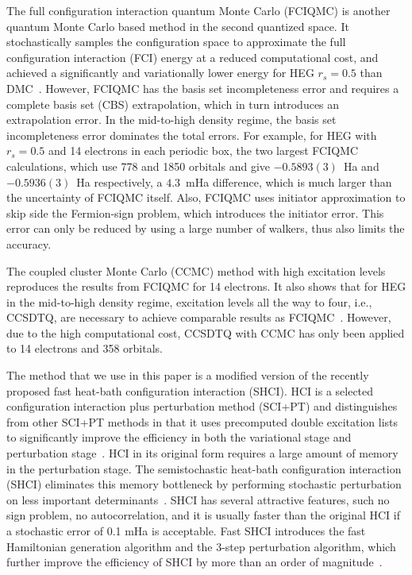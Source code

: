 The full configuration interaction quantum Monte Carlo (FCIQMC) is another quantum Monte Carlo based method in the second quantized space. It stochastically samples the configuration space to approximate the full configuration interaction (FCI) energy at a reduced computational cost, and achieved a significantly and variationally lower energy for HEG $r_s=0.5$ than DMC~\cite{shepherd2012investigation}.
However, FCIQMC has the basis set incompleteness error and requires a complete basis set (CBS) extrapolation, which in turn introduces an extrapolation error.
In the mid-to-high density regime, the basis set incompleteness error dominates the total errors.
For example, for HEG with $r_s=0.5$ and 14 electrons in each periodic box, the two largest FCIQMC calculations, which use 778 and 1850 orbitals and give $-0.5893(3)$~Ha and $-0.5936(3)$~Ha respectively, a $4.3$~mHa difference, which is much larger than the uncertainty of FCIQMC itself.
Also, FCIQMC uses initiator approximation to skip side the Fermion-sign problem, which introduces the initiator error.
This error can only be reduced by using a large number of walkers, thus also limits the accuracy.

The coupled cluster Monte Carlo (CCMC) method with high excitation levels reproduces the results from FCIQMC for 14 electrons.
It also shows that for HEG in the mid-to-high density regime, excitation levels all the way to four, i.e., CCSDTQ, are necessary to achieve comparable results as FCIQMC~\cite{neufeld2017study}.
However, due to the high computational cost, CCSDTQ with CCMC has only been applied to 14 electrons and 358 orbitals.

The method that we use in this paper is a modified version of the recently proposed fast heat-bath configuration interaction (SHCI).
HCI is a selected configuration interaction plus perturbation method (SCI+PT) and distinguishes from other SCI+PT methods in that it uses precomputed double excitation lists to significantly improve the efficiency in both the variational stage and perturbation stage~\cite{holmes2016heat}.
HCI in its original form requires a large amount of memory in the perturbation stage.
The semistochastic heat-bath configuration interaction (SHCI) eliminates this memory bottleneck by performing stochastic perturbation on less important determinants~\cite{sharma2017semistochastic}.
SHCI has several attractive features, such no sign problem, no autocorrelation, and it is usually faster than the original HCI if a stochastic error of 0.1 mHa is acceptable.
Fast SHCI introduces the fast Hamiltonian generation algorithm and the 3-step perturbation algorithm, which further improve the efficiency of SHCI by more than an order of magnitude~\cite{li2018fast}.

